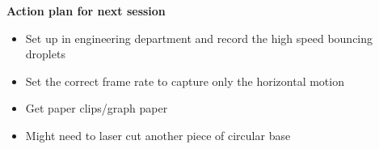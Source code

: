 \bigskip

\textbf{Action plan for next session}

\begin{itemize}
\item Set up in engineering department and record the high speed bouncing droplets
\item Set the correct frame rate to capture only the horizontal motion
\item Get paper clips/graph paper
\item Might need to laser cut another piece of circular base
\end{itemize}
